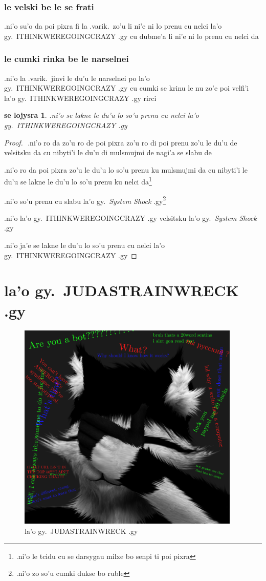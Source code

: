 \documentclass{report}
\newtheorem{thm}{se lojysra}
\begin{document}
\subsection{le velski be le se frati}
.ni'o su'o da poi pixra fi la .varik.\ zo'u li ni'e ni lo prenu cu nelci la'o gy.\ ITHINKWEREGOINGCRAZY .gy cu dubme'a li ni'e ni lo prenu cu nelci da

\subsection{le cumki rinka be le narselnei}
.ni'o la .varik.\ jinvi le du'u le narselnei po la'o gy.\ ITHINKWEREGOINGCRAZY .gy  cu cumki se krinu le nu zo'e poi velfi'i la'o gy.\ ITHINKWEREGOINGCRAZY .gy rirci

\begin{thm}
.ni'o se lakne le du'u lo so'u prenu cu nelci la'o gy.\ ITHINKWEREGOINGCRAZY .gy

\end{thm}
\begin{proof}
${}$
.ni'o ro da zo'u ro de poi pixra zo'u ro di poi prenu zo'u le du'u de velsitsku da cu nibyti'i le du'u di mulsmujmi de nagi'a se slabu de

.ni'o ro da poi pixra zo'u le du'u lo so'u prenu ku mulsmujmi da cu nibyti'i le du'u se lakne le du'u lo so'u prenu ku nelci da\footnote{.ni'o le tcidu cu se darsygau milxe bo senpi ti poi pixra}

.ni'o so'u prenu cu slabu la'o gy.\ \textit{System Shock} .gy\footnote{.ni'o zo so'u cumki dukse bo ruble}

.ni'o la'o gy.\ ITHINKWEREGOINGCRAZY .gy velsitsku la'o gy.\ \textit{System Shock} .gy

.ni'o ja'e se lakne le du'u lo so'u prenu cu nelci la'o gy.\ ITHINKWEREGOINGCRAZY .gy

\end{proof}
\chapter{la'o gy.\ JUDASTRAINWRECK .gy}
\begin{figure}[ht]
	\centering
	\includegraphics[height=10cm]{judastrainwreck/judastrainwreck.png}
	\caption[center]{la'o gy.\ JUDASTRAINWRECK .gy}
\end{figure}
\end{document}

